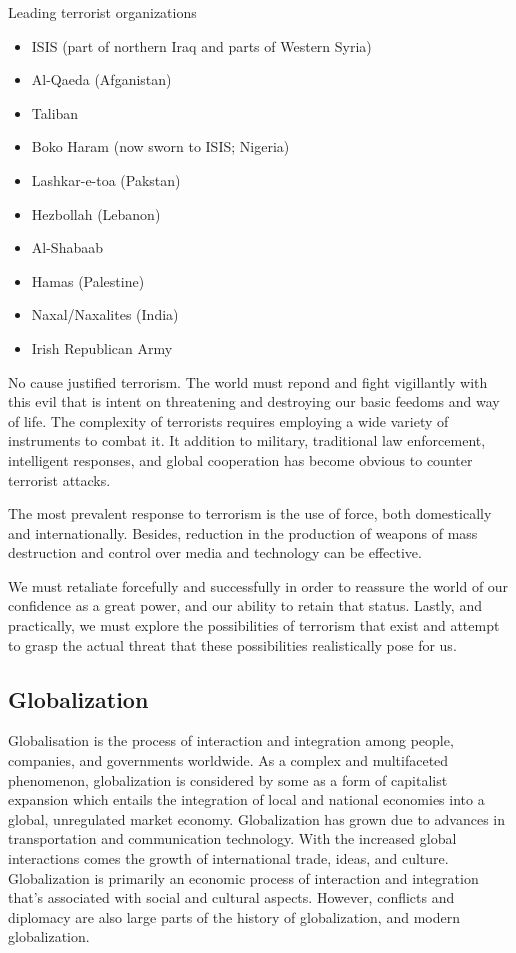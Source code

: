 \documentclass[
  openany]{book}
\providecommand{\tightlist}{%
  \setlength{\itemsep}{0pt}\setlength{\parskip}{0pt}}
\begin{document}
Leading terrorist organizations

\begin{itemize}
\tightlist
\item
  ISIS (part of northern Iraq and parts of Western Syria)
\item
  Al-Qaeda (Afganistan)
\item
  Taliban
\item
  Boko Haram (now sworn to ISIS; Nigeria)
\item
  Lashkar-e-toa (Pakstan)
\item
  Hezbollah (Lebanon)
\item
  Al-Shabaab
\item
  Hamas (Palestine)
\item
  Naxal/Naxalites (India)
\item
  Irish Republican Army
\end{itemize}

No cause justified terrorism. The world must repond and fight vigillantly with this evil that is intent on threatening and destroying our basic feedoms and way of life. The complexity of terrorists requires employing a wide variety of instruments to combat it. It addition to military, traditional law enforcement, intelligent responses, and global cooperation has become obvious to counter terrorist attacks.

The most prevalent response to terrorism is the use of force, both domestically and internationally. Besides, reduction in the production of weapons of mass destruction and control over media and technology can be effective.

We must retaliate forcefully and successfully in order to reassure the world of our confidence as a great power, and our ability to retain that status. Lastly, and practically, we must explore the possibilities of terrorism that exist and attempt to grasp the actual threat that these possibilities realistically pose for us.

\hypertarget{globalization}{%
\subsection{Globalization}\label{globalization}}

Globalisation is the process of interaction and integration among people, companies, and governments worldwide. As a complex and multifaceted phenomenon, globalization is considered by some as a form of capitalist expansion which entails the integration of local and national economies into a global, unregulated market economy. Globalization has grown due to advances in transportation and communication technology. With the increased global interactions comes the growth of international trade, ideas, and culture. Globalization is primarily an economic process of interaction and integration that's associated with social and cultural aspects. However, conflicts and diplomacy are also large parts of the history of globalization, and modern globalization.
\end{document}
